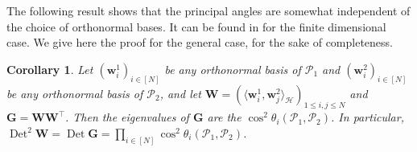 \documentclass[twoside,11pt]{book}
\newtheorem{corollary}{Corollary}
\DeclareMathOperator{\Det}{Det}
\DeclareMathOperator{\Tran}{\intercal}
\begin{document}
The following result shows that the principal angles are somewhat independent of the choice of orthonormal bases. It can be found in \cite{BjGo73,MiBe92} for the finite dimensional case. We give here the proof for the general case, for the sake of completeness.
\begin{corollary}\label{cor:cos_det_relationship}
Let $(\bm{w}^{1}_{i})_{i \in [N]}$ be any orthonormal basis of $\mathcal{P}_{1}$ and $(\bm{w}^{2}_{i})_{i \in [N]}$ be any orthonormal basis of $\mathcal{P}_{2}$, and let $\bm{W} = (\langle \bm{w}^{1}_{i},\bm{w}^{2}_{j} \rangle_{\mathcal{H}})_{1\leq i,j \leq N}$ and $\bm{G} = \bm{W}\bm{W}^{\Tran}$. Then
the eigenvalues of $\bm{G}$ are the $\cos^{2} \theta_{i}(\mathcal{P}_{1},\mathcal{P}_{2})$. In particular, $\Det^{2} \bm{W} = \Det \bm{G} =  \prod\limits_{i \in [N]} \cos^{2} \theta_{i}(\mathcal{P}_{1},\mathcal{P}_{2})$.
\end{corollary}
\end{document}
